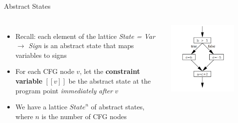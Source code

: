 \documentclass[aspectratio=169,xcolor=dvipsnames]{beamer}
\begin{document}
\begin{frame}[fragile]{Abstract States}

	\begin{columns}[c] %


		\begin{itemize}
			\item Recall: each element of the lattice {\it State = Var $\rightarrow$ Sign} is an
			      abstract state that maps variables to signs
			\item For each CFG node $v$, let the {\bf constraint variable} $[[v]]$ be the abstract state at the program point {\it
					      immediately after} $v$
			\item We have a lattice $\textit{State}^{n}$ of abstract states, where $n$ is the
			      number of CFG nodes
		\end{itemize}

		\includegraphics[width=0.8\textwidth]{img/2.png}
	\end{columns}
\end{frame}

\end{document}

